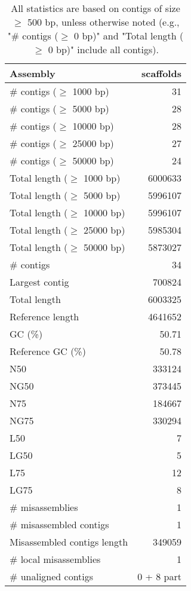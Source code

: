 \documentclass[12pt,a4paper]{article}
\begin{document}
\begin{table}[ht]
\begin{center}
\caption{All statistics are based on contigs of size $\geq$ 500 bp, unless otherwise noted (e.g., "\# contigs ($\geq$ 0 bp)" and "Total length ($\geq$ 0 bp)" include all contigs).}
\begin{tabular}{|l*{1}{|r}|}
\hline
Assembly & scaffolds \\ \hline
\# contigs ($\geq$ 1000 bp) & 31 \\ \hline
\# contigs ($\geq$ 5000 bp) & 28 \\ \hline
\# contigs ($\geq$ 10000 bp) & 28 \\ \hline
\# contigs ($\geq$ 25000 bp) & 27 \\ \hline
\# contigs ($\geq$ 50000 bp) & 24 \\ \hline
Total length ($\geq$ 1000 bp) & 6000633 \\ \hline
Total length ($\geq$ 5000 bp) & 5996107 \\ \hline
Total length ($\geq$ 10000 bp) & 5996107 \\ \hline
Total length ($\geq$ 25000 bp) & 5985304 \\ \hline
Total length ($\geq$ 50000 bp) & 5873027 \\ \hline
\# contigs & 34 \\ \hline
Largest contig & 700824 \\ \hline
Total length & 6003325 \\ \hline
Reference length & 4641652 \\ \hline
GC (\%) & 50.71 \\ \hline
Reference GC (\%) & 50.78 \\ \hline
N50 & 333124 \\ \hline
NG50 & 373445 \\ \hline
N75 & 184667 \\ \hline
NG75 & 330294 \\ \hline
L50 & 7 \\ \hline
LG50 & 5 \\ \hline
L75 & 12 \\ \hline
LG75 & 8 \\ \hline
\# misassemblies & 1 \\ \hline
\# misassembled contigs & 1 \\ \hline
Misassembled contigs length & 349059 \\ \hline
\# local misassemblies & 1 \\ \hline
\# unaligned contigs & 0 + 8 part \\ \hline

\end{tabular}
\end{center}
\end{table}
\end{document}
